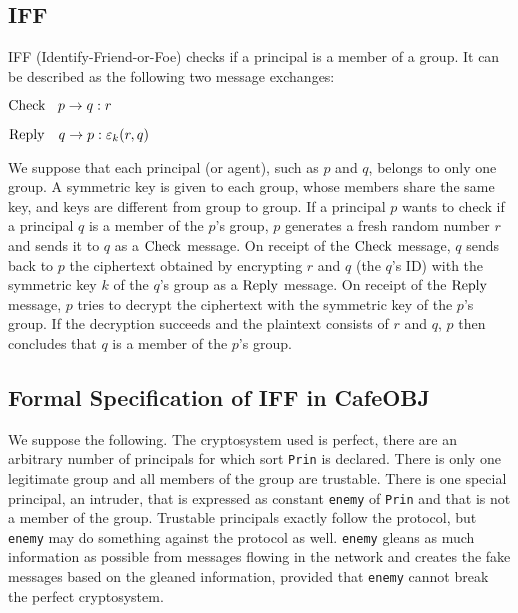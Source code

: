 \documentclass[a4paper,fleqn]{cas-dc}
\begin{document}
\subsection{IFF}
IFF (Identify-Friend-or-Foe) \cite{iff2001} checks if a principal is a member of a group. It can be described as the following two message exchanges:
	
	${\rm Check} \ \ \: p \rightarrow q : r$
	
	${\rm Reply}  \ \ \ q \rightarrow p : \varepsilon_k(r,q)$
	
	\noindent
We suppose that each principal (or agent), such as $p$ and $q$, belongs to only one group. A symmetric key is given to each group, whose members share the same key, and keys are different from group to group. If a principal $p$ wants to check if a principal $q$ is a member of the $p$'s group, $p$ generates a fresh random number $r$ and sends it to $q$ as a $\rm Check$ message. 
On receipt of the $\rm Check$ message, $q$ sends back to $p$ the ciphertext obtained by encrypting $r$ and $q$ (the $q$'s ID) with the symmetric key $k$ of the $q$'s group as a $\rm Reply$ message. On receipt of the $\rm Reply$ message, $p$ tries to decrypt the ciphertext with the symmetric key of the $p$'s group. If the decryption succeeds and the plaintext consists of $r$ and $q$, $p$ then concludes that $q$ is a member of the $p$'s group. 

\subsection{Formal Specification of IFF in CafeOBJ}
\label{fsiff}
We suppose the following. The cryptosystem used is perfect, there are an arbitrary number of principals for which sort \verb!Prin! is declared. There is only one legitimate group and all members of the group are trustable. There is one special principal, an intruder, that is expressed as constant \verb!enemy! of \verb!Prin! and that is not a member of the group. Trustable principals exactly follow the protocol, but \verb!enemy! may do something against the protocol as well. 
\verb!enemy! gleans as much information as possible from messages flowing in the network and creates the fake messages based on the gleaned information, provided that \verb!enemy! cannot break the perfect cryptosystem.
\end{document}
